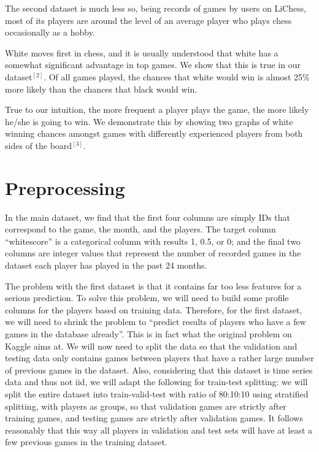 \documentclass[12pt, letterpaper]{article}
\begin{document}
\begin{multicols}{2}
The second dataset is much less so, being records of games by users on LiChess, most of its players are around the level of an average player who plays chess occasionally as a hobby.

White moves first in chess, and it is usually understood that white has a somewhat significant advantage in top games. We show that this is true in our dataset$^{[2]}$. Of all games played, the chances that white would win is almost 25\% more likely than the chances that black would win.

True to our intuition, the more frequent a player plays the game, the more likely he/she is going to win. We demonstrate this by showing two graphs of white winning chances amongst games with differently experienced players from both sides of the board$^{[3]}$.


\section*{Preprocessing}

In the main dataset, we find that the first four columns are simply IDs that correspond to the game, the month, and the players. The target column “whitescore” is a categorical column with results 1, 0.5, or 0; and the final two columns are integer values that represent the number of recorded games in the dataset each player has played in the past 24 months.

The problem with the first dataset is that it contains far too less features for a serious prediction. To solve this problem, we will need to build some profile columns for the players based on training data.
Therefore, for the first dataset, we will need to shrink the problem to “predict results of players who have a few games in the database already”. This is in fact what the original problem on Kaggle aims at. We will now need to split the data so that the validation and testing data only contains games between players that have a rather large number of previous games in the dataset. Also, considering that this dataset is time series data and thus not iid, we will adapt the following for train-test splitting: we will split the entire dataset into train-valid-test with ratio of 80:10:10 using stratified splitting, with players as groups, so that validation games are strictly after training games, and testing games are strictly after validation games. It follows reasonably that this way all players in validation and test sets will have at least a few previous games in the training dataset. 


\end{multicols}
\end{document}
